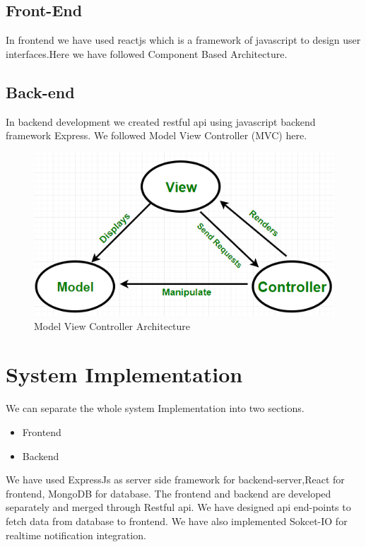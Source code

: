 \documentclass[10pt]{article}
\begin{document}
\subsection{Front-End}
In frontend we have used reactjs which is a framework of javascript to design user interfaces.Here we have followed Component Based Architecture.

\subsection{Back-end}

In backend development we created restful api using javascript backend framework Express. We followed Model View Controller (MVC) here.

\begin{figure}[H]
  \centering
  \centerline{\includegraphics[width=\textwidth]{diagram/mvc.png}}
  \caption{Model View Controller Architecture}
  \label{fig}
\end{figure}


\section{System Implementation}

We can separate the whole system Implementation into two sections.

\begin{itemize}
  \item Frontend
  \item Backend
\end{itemize}

We have used ExpressJs as server side framework for backend-server,React for frontend, MongoDB for database.
The frontend and backend are developed separately and merged through Restful api. We have designed api end-points to fetch data from database to frontend. We have also implemented Sokcet-IO for realtime notification integration.
\end{document}
